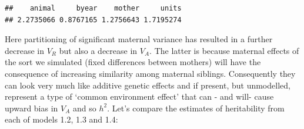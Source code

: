 \documentclass[
  12pt,
]{book}
\newenvironment{Shaded}{\begin{snugshade}}{\end{snugshade}}
\newcommand{\DataTypeTok}[1]{\textcolor[rgb]{0.13,0.29,0.53}{#1}}
\newcommand{\DecValTok}[1]{\textcolor[rgb]{0.00,0.00,0.81}{#1}}
\newcommand{\FloatTok}[1]{\textcolor[rgb]{0.00,0.00,0.81}{#1}}
\newcommand{\KeywordTok}[1]{\textcolor[rgb]{0.13,0.29,0.53}{\textbf{#1}}}
\newcommand{\NormalTok}[1]{#1}
\newcommand{\OperatorTok}[1]{\textcolor[rgb]{0.81,0.36,0.00}{\textbf{#1}}}
\newcommand{\OtherTok}[1]{\textcolor[rgb]{0.56,0.35,0.01}{#1}}
\newcommand{\StringTok}[1]{\textcolor[rgb]{0.31,0.60,0.02}{#1}}
\begin{document}
\begin{Shaded}
\end{Shaded}

\begin{verbatim}
##    animal     byear    mother     units 
## 2.2735066 0.8767165 1.2756643 1.7195274
\end{verbatim}

Here partitioning of significant maternal variance has resulted in a further decrease in \(V_R\) but also a decrease in \(V_A\). The latter is because maternal effects of the sort we simulated (fixed differences between mothers) will have the consequence of increasing similarity among maternal siblings. Consequently they can look very much like additive genetic effects and if present, but unmodelled, represent a type of `common environment effect' that can - and will- cause upward bias in \(V_A\) and so \(h^2\). Let's compare the estimates of heritability from each of models 1.2, 1.3 and 1.4:
\end{document}
